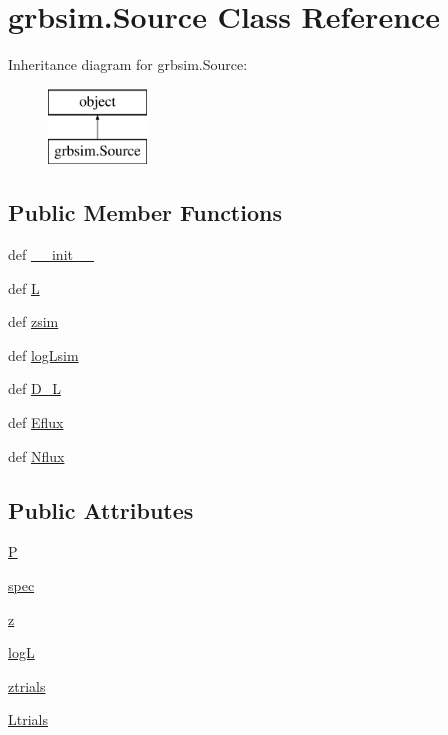 \hypertarget{classgrbsim_1_1_source}{\section{grbsim.\-Source Class Reference}
\label{classgrbsim_1_1_source}
}
Inheritance diagram for grbsim.\-Source\-:\begin{figure}[H]
\begin{center}
\leavevmode
\includegraphics[height=2.000000cm]{dd/d6f/classgrbsim_1_1_source}
\end{center}
\end{figure}
\subsection*{Public Member Functions}
\begin{DoxyCompactItemize}
\item 
def \hyperlink{classgrbsim_1_1_source_a6e483581eeabd09848f71dcdfb46a7bb}{\-\_\-\-\_\-init\-\_\-\-\_\-}
\item 
def \hyperlink{classgrbsim_1_1_source_ad56402a366d30bde07effb65c0645195}{L}
\item 
def \hyperlink{classgrbsim_1_1_source_abc5ca7a3ed742374da80d0cb60aad138}{zsim}
\item 
def \hyperlink{classgrbsim_1_1_source_a412a8b90423af5e02d62aeea10d896d8}{log\-Lsim}
\item 
def \hyperlink{classgrbsim_1_1_source_a0bf9a498b93dfa540547f658e5b4a631}{D\-\_\-\-L}
\item 
def \hyperlink{classgrbsim_1_1_source_a408e7cbd2964af597e37b8cce0934e3e}{Eflux}
\item 
def \hyperlink{classgrbsim_1_1_source_aa9e49ab85c24a8d50825fd733c6c16c9}{Nflux}
\end{DoxyCompactItemize}
\subsection*{Public Attributes}
\begin{DoxyCompactItemize}
\item 
\hyperlink{classgrbsim_1_1_source_a40756599695386befd7d94dea7c45c67}{P}
\item 
\hyperlink{classgrbsim_1_1_source_aa8feb6cf28391b9206c57f0b5ea1dd2a}{spec}
\item 
\hyperlink{classgrbsim_1_1_source_aa983a728c20508521a6e442d8692802a}{z}
\item 
\hyperlink{classgrbsim_1_1_source_a1c36aeb1b0caa2b1c72b1d9536e04999}{log\-L}
\item 
\hyperlink{classgrbsim_1_1_source_a49ad1adc6c791d565301090c86734bd3}{ztrials}
\item 
\hyperlink{classgrbsim_1_1_source_a80a43f13cc9341bb425fc1e29c799a79}{Ltrials}
\end{DoxyCompactItemize}


